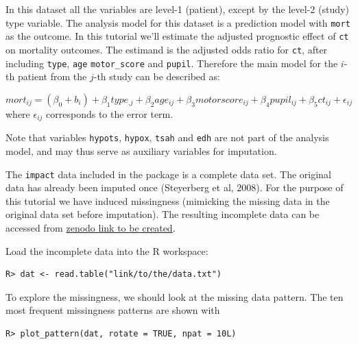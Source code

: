 \documentclass[
  article]{jss}
\begin{document}
In this dataset all the variables are level-1 (patient), except by the
level-2 (study) type variable. The analysis model for this dataset is a
prediction model with \texttt{mort} as the outcome. In this tutorial
we'll estimate the adjusted prognostic effect of \texttt{ct} on
mortality outcomes. The estimand is the adjusted odds ratio for
\texttt{ct}, after including \texttt{type}, \texttt{age}
\texttt{motor\_score} and \texttt{pupil}. Therefore the main model for
the \(i\)-th patient from the \(j\)-th study can be described as:

\[ mort_{ij} = (\beta_0 + b_i) + \beta_1type_{.j}+ \beta_2age_{ij}+ \beta_3motorscore_{ij} + \beta_4pupil_{ij} + \beta_5ct_{ij}+\epsilon_{ij}\]
where \(\epsilon_{ij}\) corresponds to the error term.

Note that variables \texttt{hypots}, \texttt{hypox}, \texttt{tsah} and
\texttt{edh} are not part of the analysis model, and may thus serve as
auxiliary variables for imputation.

The \texttt{impact} data included in the  package is a
complete data set. The original data has already been imputed once
(Steyerberg et al, 2008). For the purpose of this tutorial we have
induced missingness (mimicking the missing data in the original data set
before imputation). The resulting incomplete data can be accessed from
\href{https://zenodo.com}{zenodo link to be created}.

Load the incomplete data into the R workspace:

\begin{verbatim}
R> dat <- read.table("link/to/the/data.txt") 
\end{verbatim}

To explore the missingness, we should look at the missing data pattern.
The ten most frequent missingness patterns are shown with

\begin{verbatim}
R> plot_pattern(dat, rotate = TRUE, npat = 10L)  
\end{verbatim}
\end{document}
